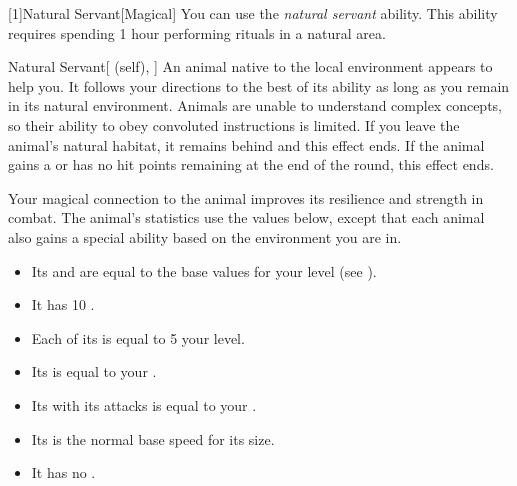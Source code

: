         [1]{Natural Servant}[Magical]
        You can use the \textit{natural servant} ability.
        This ability requires spending 1 hour performing rituals in a natural area.
        \begin{attuneability}{Natural Servant}[ (self), ]
            An animal native to the local environment appears to help you.
            It follows your directions to the best of its ability as long as you remain in its natural environment.
            Animals are unable to understand complex concepts, so their ability to obey convoluted instructions is limited.
            If you leave the animal's natural habitat, it remains behind and this effect ends.
            If the animal gains a  or has no hit points remaining at the end of the round, this effect ends.

            Your magical connection to the animal improves its resilience and strength in combat.
            The animal's statistics use the values below, except that each animal also gains a special ability based on the environment you are in.
            \begin{itemize}
                \item Its  and  are equal to the base values for your level (see ).
                \item It has 10 .
                \item Each of its  is equal to 5 \add your level.
                \item Its  is equal to your  .
                \item Its  with its attacks is equal to your .
                \item Its  is the normal base speed for its size.
                \item It has no .
            \end{itemize}
        \end{attuneability}

